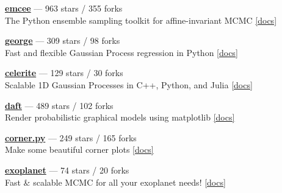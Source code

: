 \item \href{https://github.com/dfm/emcee}{{\bf emcee}} --- 963 stars / 355 forks \\
The Python ensemble sampling toolkit for affine-invariant MCMC \href{https://emcee.readthedocs.io}{[docs]}

\item \href{https://github.com/dfm/george}{{\bf george}} --- 309 stars / 98 forks \\
Fast and flexible Gaussian Process regression in Python \href{http://george.readthedocs.io}{[docs]}

\item \href{https://github.com/dfm/celerite}{{\bf celerite}} --- 129 stars / 30 forks \\
Scalable 1D Gaussian Processes in C++, Python, and Julia \href{http://celerite.rtfd.io}{[docs]}

\item \href{https://github.com/daft-dev/daft}{{\bf daft}} --- 489 stars / 102 forks \\
Render probabilistic graphical models using matplotlib \href{https://docs.daft-pgm.org}{[docs]}

\item \href{https://github.com/dfm/corner.py}{{\bf corner.py}} --- 249 stars / 165 forks \\
Make some beautiful corner plots \href{http://corner.readthedocs.io}{[docs]}

\item \href{https://github.com/dfm/exoplanet}{{\bf exoplanet}} --- 74 stars / 20 forks \\
Fast {\&} scalable MCMC for all your exoplanet needs!  \href{https://exoplanet.dfm.io}{[docs]}
